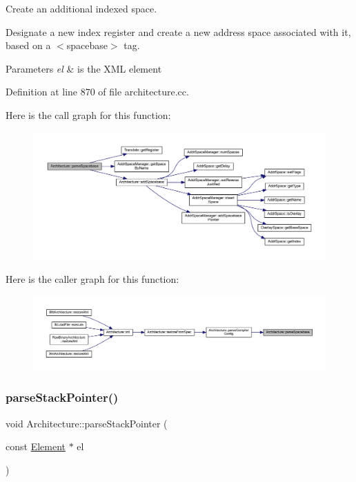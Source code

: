 Create an additional indexed space. 

Designate a new index register and create a new address space associated with it, based on a $<$spacebase$>$ tag. 
\begin{DoxyParams}{Parameters}
{\em el} & is the X\+ML element \\
\hline
\end{DoxyParams}


Definition at line 870 of file architecture.\+cc.

Here is the call graph for this function\+:
\nopagebreak
\begin{figure}[H]
\begin{center}
\leavevmode
\includegraphics[width=350pt]{class_architecture_adf3b1aecaff0ca84c647ddbe6e25de5c_cgraph}
\end{center}
\end{figure}
Here is the caller graph for this function\+:
\nopagebreak
\begin{figure}[H]
\begin{center}
\leavevmode
\includegraphics[width=350pt]{class_architecture_adf3b1aecaff0ca84c647ddbe6e25de5c_icgraph}
\end{center}
\end{figure}
\mbox{\label{class_architecture_aac48da0d464ff216982db607b43d4757}} 
\subsubsection{\texorpdfstring{parseStackPointer()}{parseStackPointer()}}
{\footnotesize\ttfamily void Architecture\+::parse\+Stack\+Pointer (\begin{DoxyParamCaption}\item[{const \mbox{\hyperlink{class_element}{Element}} $\ast$}]{el }\end{DoxyParamCaption})\hspace{0.3cm}{\ttfamily [protected]}}



